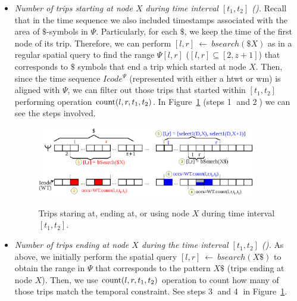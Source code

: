 	\begin{itemize}[leftmargin=3mm]

		\setlength{\itemindent}{0mm}
		\item {\em Number of trips starting at node $X$ during time interval $[t_1,t_2]$ (\Tswx).}
		Recall that in the time sequence we also included timestamps associated with the area of $\$$-symbols in $\Psi$.
		Particularly, for each $\$$, we keep the time of the first node of its trip. Therefore, 
		we can perform $[l,r]~\leftarrow~bsearch(\$X)$ as in a regular spatial query to find the
		range $\Psi[l,r]$ ($[l,r]\subseteq [2,z+1]$) that corresponds to $\$$ symbols that end a trip
		which started at node $X$. Then, since the time sequence $Icode^{\Psi}$ 
		(represented with either a \gls{htwt} or \gls{wm}) is
		 aligned with $\Psi$, we can filter out those trips that started within $[t_1,t_2]$ performing
		operation $\operatorname{count}(l,r,t_1,t_2)$. In Figure~\ref{fig:search2} (steps \textcircled{1} and \textcircled{2}) we can see the steps involved.

	\begin{figure}[thb]
		\begin{center}
			{\includegraphics[width=0.90\textwidth]{figures/search2.eps}}
		\end{center}
		\vspace{-0.3cm}
		\caption{Trips staring at, ending at, or using node $X$  during time interval $[t_1,t_2]$.}
		\label{fig:search2}
	\end{figure}
		
		\item {\em Number of trips ending at node $X$ during the time interval $[t_1,t_2]$ (\Tewx). }
		As above, we initially perform the spatial query $[l,r]~\leftarrow~bsearch(X\$)$ to 
		obtain the range in $\Psi$ that corresponds to the pattern $X\$$ (trips ending at node $X$).
		Then, we use  $\operatorname{count}(l,r,t_1,t_2)$ operation to count how many of those trips match the temporal constraint.
		See steps \textcircled{3} and \textcircled{4} in Figure~\ref{fig:search2}.
		

\end{itemize}
